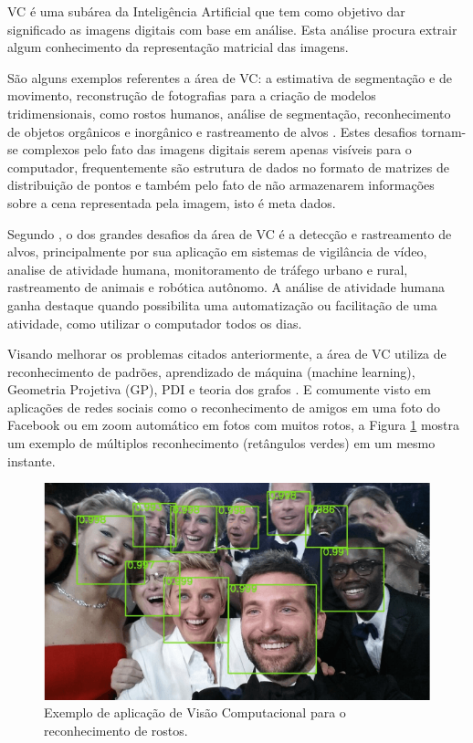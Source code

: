 VC é uma subárea da Inteligência Artificial que tem como objetivo dar significado as imagens digitais com base em análise. Esta análise procura extrair algum conhecimento da representação matricial das imagens. 

São alguns exemplos referentes a área de VC: a estimativa de segmentação e de movimento, reconstrução de fotografias para a criação de modelos tridimensionais, como rostos humanos, análise de segmentação, reconhecimento de objetos orgânicos e inorgânico e rastreamento de alvos . Estes desafios tornam-se complexos pelo fato das imagens digitais serem apenas visíveis para o computador, frequentemente são estrutura de dados no formato de matrizes de distribuição de pontos e também pelo fato de não armazenarem informações sobre a cena representada pela imagem, isto é meta dados.

Segundo , o dos grandes desafios da área de VC é a detecção e rastreamento de alvos, principalmente por sua aplicação em sistemas de vigilância de vídeo, analise de atividade humana, monitoramento de tráfego urbano e rural, rastreamento de animais e robótica autônomo. A análise de atividade humana ganha destaque quando possibilita uma automatização ou facilitação de uma atividade, como utilizar o computador todos os dias.

Visando melhorar os problemas citados anteriormente, a área de VC utiliza de reconhecimento de padrões, aprendizado de máquina (machine learning), Geometria Projetiva (GP), PDI e teoria dos grafos . E comumente visto em aplicações de redes sociais como o reconhecimento de amigos em uma foto do Facebook ou em zoom automático em fotos com muitos rotos, a Figura \ref{fig:exemplo-vc} mostra um exemplo de múltiplos reconhecimento (retângulos verdes) em um mesmo instante.

\begin{figure}[htbp]
 \centering \includegraphics[scale=1]{img/figura-1.png}
\caption{Exemplo de aplicação de Visão Computacional para o reconhecimento de rostos.} 
\label{fig:exemplo-vc}
\end{figure}


